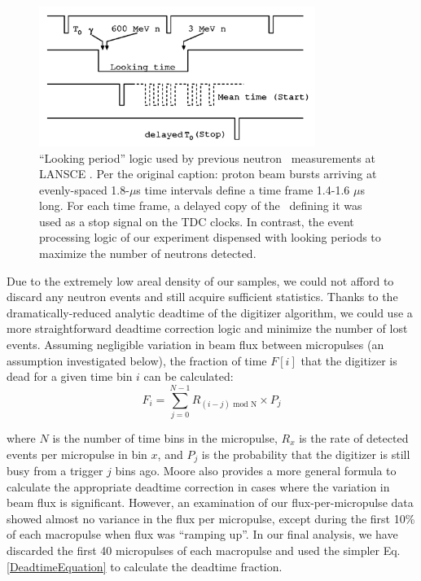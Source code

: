 \begin{figure}[tb]
    \centering
    \includegraphics[width=0.8\textwidth]{figures/AnalogLogic.png}
    \caption[``Looking period'' logic from previous neutron \tot\ measurements at LANSCE]
    {
        ``Looking period'' logic used by previous neutron \tot\ measurements at LANSCE
        \cite{Abfalterer2001}. Per the original caption: proton beam bursts arriving at
        evenly-spaced 1.8-$\mu$s time intervals define a time frame 1.4-1.6 $\mu$s long. For each
        time frame, a delayed copy of the \tZero\ defining it was used as a stop signal on the TDC
    clocks. In contrast, the event processing logic of our experiment dispensed with looking 
    periods to maximize the number of neutrons detected.}
    \label{AnalogLogic}
\end{figure}

Due to the extremely low areal density of our samples,
we could not afford to discard any neutron events and still acquire sufficient statistics. 
Thanks to the dramatically-reduced analytic deadtime of the digitizer algorithm,
we could use a more straightforward deadtime correction logic and minimize the
number of lost events. Assuming negligible variation in beam flux between micropulses
(an assumption investigated below), the fraction of time $F[i]$ that the digitizer is dead 
for a given time bin $i$ can be calculated:
\begin{equation}
    F_{i} = \sum^{N-1}_{j=0} R_{(i-j)\text{ mod N}}\times P_{j}
\end{equation}

\noindent
where $N$ is the number of time bins in the micropulse, $R_{x}$ is the rate of
detected events per micropulse in bin $x$, and $P_{j}$ is the probability that the
digitizer is still busy from a trigger $j$ bins ago. Moore \cite{Moore1980} also provides
a more general 
formula to calculate the appropriate deadtime correction in cases where the variation in beam 
flux is significant. However, an examination of our flux-per-micropulse data 
showed almost no variance in the flux per micropulse, except during the first 10\%
of each macropulse when flux was ``ramping up''. In our final analysis, we have discarded the 
first 40 micropulses of each macropulse and used the simpler Eq. \ref{DeadtimeEquation} to 
calculate the deadtime fraction.

